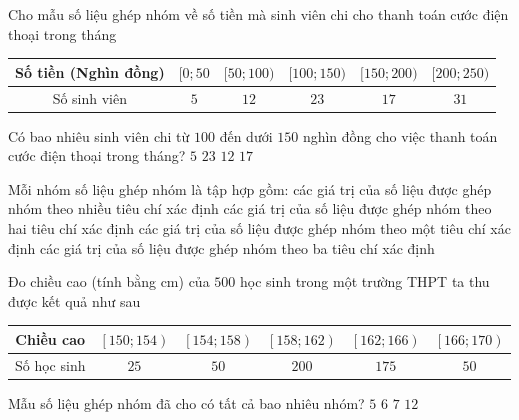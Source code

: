 \begin{ex}%
	Cho mẫu số  liệu ghép nhóm về số tiền mà sinh viên chi cho thanh toán cước điện thoại trong tháng
	\begin{center}
		\begin{tabular}{|c|c|c|c|c|c|}
			 \hline
			Số tiền (Nghìn đồng) & $[0{;}50$ & $[50{;}100)$ &  $[100{;}150)$ & $[150{;}200)$ & $[200{;}250)$ \\
			\hline 
			Số sinh viên & $5$ & $12$ & $23$ & $17$ & $31$ \\ 
			\hline 
		\end{tabular}
	\end{center}
	Có bao nhiêu sinh viên chi từ $100$ đến dưới  $150$ nghìn đồng cho việc thanh toán cước điện thoại trong tháng?
	\choice 
		{$5$} 
		{\True  $23$}
		{$12$} 
		{$17$} 
\end{ex}

\begin{ex}%
	 Mỗi nhóm số liệu ghép nhóm là tập hợp gồm:
	\choice 
		{các giá trị  của số liệu được ghép nhóm theo nhiều tiêu chí xác định}
		{các giá trị của số liệu được  ghép nhóm theo hai tiêu chí xác định}
		{\True các giá trị của số liệu được ghép nhóm theo một  tiêu chí xác định}
		{các giá trị của số liệu được ghép  nhóm theo ba tiêu chí xác định}
\end{ex}

\begin{ex}%
	Đo chiều cao (tính bằng cm)  của $500$ học sinh trong một trường THPT ta thu được kết quả như sau
	\begin{center}
		\begin{tabular}{|c|c|c|c|c|c|}
			\hline 
			Chiều cao &  $\left[150;154\right)$ & $\left[154;158\right)$ & $\left[158;162\right)$ & $\left[162;166\right)$ & $\left[166;170\right)$ \\
			 \hline
			Số học sinh & $25$ & $50$ & $200$ & $175$ & $50$ \\ 
			 \hline
		\end{tabular}
	\end{center}
	Mẫu số liệu  ghép nhóm đã cho có tất cả bao nhiêu nhóm?
	\choice 
		 {\True $5$}
		 {$6$}
		 {$7$}
		{$12$} 
\end{ex}

